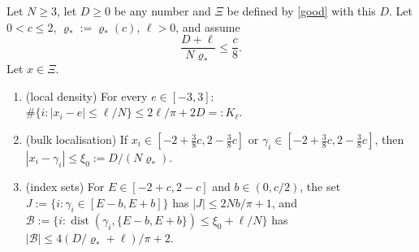 \begin{lemma}\label{lem:countC}
Let $N\ge3$, let $D\ge0$ be any number and $\Xi$ be defined by \eqref{good} with this $D$. Let $0<c\le2$, $\varrho_*:=\varrho_*(c)$, $\ell>0$, and assume
\begin{equation}\tag{H$_\ell$}\label{c2:counthyp}
\frac{D+\ell}{N\varrho_*}\le\frac c8 .
\end{equation}
Let $x\in\Xi$.
\begin{enumerate}[label=(\alph*),itemsep=1pt]
\item (local density) For every $e\in[-3,3]$: $\#\{i:|x_i-e|\le\ell/N\}\le 2\ell/\pi+2D=:K_\ell$.
\item (bulk localisation) If $x_i\in[-2+\frac38c,2-\frac38c]$ or $\gamma_i\in[-2+\frac38c,2-\frac38c]$, then $|x_i-\gamma_i|\le\xi_0:=D/(N\varrho_*)$.
\item (index sets) For $E\in[-2+c,2-c]$ and $b\in(0,c/2)$, the set $J:=\{i:\gamma_i\in[E-b,E+b]\}$ has $|J|\le 2Nb/\pi+1$, and
$\mathcal B:=\{i:\operatorname{dist}(\gamma_i,\{E-b,E+b\})\le\xi_0+\ell/N\}$ has $|\mathcal B|\le 4(D/\varrho_*+\ell)/\pi+2$.
\end{enumerate}
\end{lemma}

